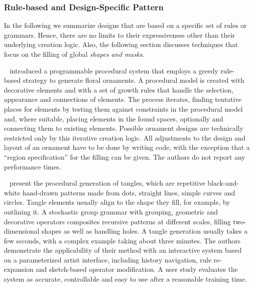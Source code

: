  

\subsubsection{Rule-based and Design-Specific Pattern}
\label{subsubsec:analysis_rulebased_and_designspecific}

In the following we summarize designs that are based on a specific set of rules or grammars. Hence, there are no limits to their expressiveness other than their underlying creation logic. Also, the following section discusses techniques that focus on the filling of global \textit{shapes and masks}.



\citeauthor*{wong_1998_cgf}~\cite{wong_1998_cgf} introduced a programmable procedural system that employs a greedy rule-based strategy to generate floral ornaments. A procedural model is created with decorative elements and with a set of growth rules that handle the selection, appearance and connections of elements. The process iterates, finding tentative places for elements by testing them against constraints in the procedural model and, where suitable, placing elements in the found spaces, optionally and connecting them to existing elements. Possible ornament designs are technically restricted only by this iterative creation logic. All adjustments to the design and layout of an ornament have to be done by writing code, with the exception that a ``region specification'' for the filling can be given. The authors do not report any performance times.

\citeauthor*{santoni_2016_ggp}~\cite{santoni_2016_ggp} present the procedural generation of tangles, which are repetitive black-and-white hand-drawn patterns made from dots, straight lines, simple curves and circles. Tangle elements usually align to the shape they fill, for example, by outlining it. A stochastic group grammar with grouping, geometric and decorative operators composites recursive patterns at different scales, filling two-dimensional shapes as well as handling holes. A tangle generation usually takes a few seconds, with a complex example taking about three minutes. The authors demonstrate the applicability of their method with an interactive system based on a parameterized artist interface, including history navigation, rule re-expansion and sketch-based operator modification. A user study evaluates the system as accurate, controllable and easy to use after a reasonable training time.

